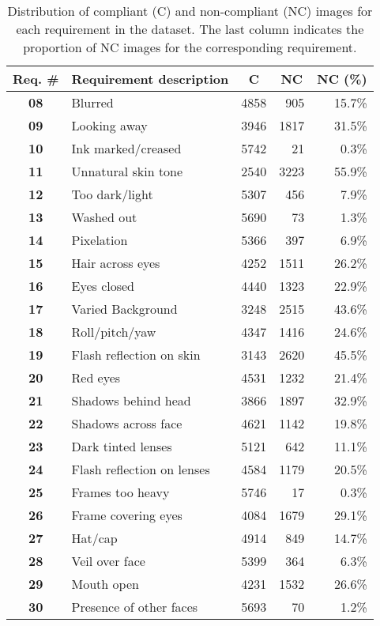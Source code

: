 \begin{table}[tb]
\centering
\caption{Distribution of compliant (C) and non-compliant (NC) images for each requirement in the dataset. The last column indicates the proportion of NC images for the corresponding requirement.}
\label{tab:req-dist}
\begin{tabular}{clrrr}
\hline
\textbf{Req. \#} & \multicolumn{1}{c}{\textbf{Requirement description}} & \multicolumn{1}{c}{\textbf{C}} & \multicolumn{1}{c}{\textbf{NC}} & \multicolumn{1}{c}{\textbf{NC (\%)}} \\ \hline
\textbf{08} & Blurred & 4858 & 905 & 15.7\% \\
\textbf{09} & Looking away & 3946 & 1817 & 31.5\% \\
\textbf{10} & Ink marked/creased & 5742 & 21 & 0.3\% \\
\textbf{11} & Unnatural skin tone & 2540 & 3223 & 55.9\% \\
\textbf{12} & Too dark/light & 5307 & 456 & 7.9\% \\
\textbf{13} & Washed out & 5690 & 73 & 1.3\% \\
\textbf{14} & Pixelation & 5366 & 397 & 6.9\% \\
\textbf{15} & Hair across eyes & 4252 & 1511 & 26.2\% \\
\textbf{16} & Eyes closed & 4440 & 1323 & 22.9\% \\
\textbf{17} & Varied Background & 3248 & 2515 & 43.6\% \\
\textbf{18} & Roll/pitch/yaw & 4347 & 1416 & 24.6\% \\
\textbf{19} & Flash reflection on skin & 3143 & 2620 & 45.5\% \\
\textbf{20} & Red eyes & 4531 & 1232 & 21.4\% \\
\textbf{21} & Shadows behind head & 3866 & 1897 & 32.9\% \\
\textbf{22} & Shadows across face & 4621 & 1142 & 19.8\% \\
\textbf{23} & Dark tinted lenses & 5121 & 642 & 11.1\% \\
\textbf{24} & Flash reflection on lenses & 4584 & 1179 & 20.5\% \\
\textbf{25} & Frames too heavy & 5746 & 17 & 0.3\% \\
\textbf{26} & Frame covering eyes & 4084 & 1679 & 29.1\% \\
\textbf{27} & Hat/cap & 4914 & 849 & 14.7\% \\
\textbf{28} & Veil over face & 5399 & 364 & 6.3\% \\
\textbf{29} & Mouth open & 4231 & 1532 & 26.6\% \\
\textbf{30} & Presence of other faces & 5693 & 70 & 1.2\% \\ \hline
\end{tabular}%
\end{table}